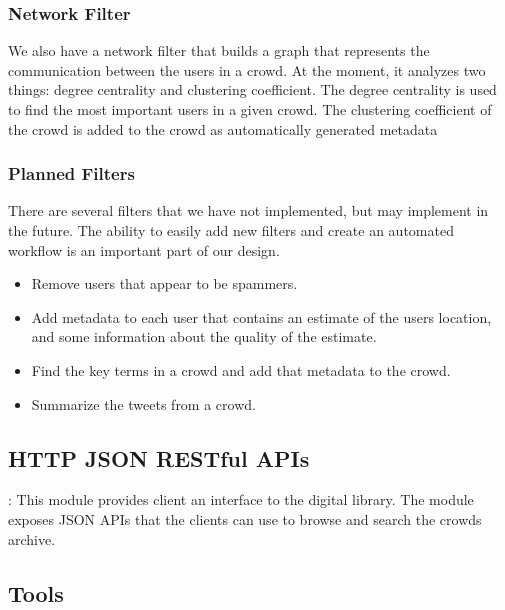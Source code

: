 \documentclass{sig-alternate}
\begin{document}
\subsubsection{Network Filter}
We also have a network filter that builds a graph that represents the
communication between the users in a crowd. At the moment, it analyzes two things:
degree centrality and clustering coefficient.  The degree centrality is used to
find the most important users in a given crowd. The clustering coefficient of
the crowd is added to the crowd as automatically generated metadata 

\subsubsection{Planned Filters}
There are several filters that we have not implemented, but may implement in
the future. The ability to easily add new filters and create an automated
workflow is an important part of our design.
\begin{itemize}
\item Remove users that appear to be spammers.
\item Add metadata to each user that contains an estimate of the users
    location, and some information about the quality of the estimate.
\item Find the key terms in a crowd and add that metadata to the crowd.
\item Summarize the tweets from a crowd.
\end{itemize}

\subsection{HTTP JSON RESTful APIs}: This module provides client an interface to the digital library. The module exposes JSON APIs that the clients can use to browse and search the crowds archive.

\subsection{Tools}
\end{document}
